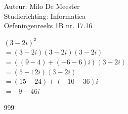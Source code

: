 \documentclass[a4paper]{article}
\begin{document}
  
\noindent \large Auteur: Milo De Meester \\
\noindent \large Studierichting: Informatica\\
\noindent \large Oefeningenreeks 1B nr. 17.16\\

\medskip

\normalsize

$(3-2i)^3$\\

$=(3-2i)(3-2i)(3-2i)$\\

$= ((9-4) + (-6-6) i) (3-2i)$\\

$=(5-12 i)(3-2i)$\\

$=(15-24)+(-10-36)i$\\

$=-9-46i$

\begin{thebibliography}{999}
\end{thebibliography}
\end{document}
